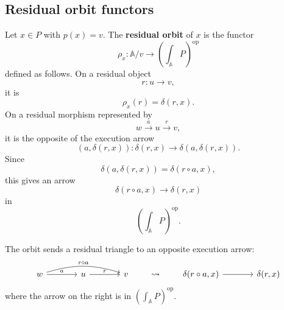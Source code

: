 \subsection{Residual orbit functors}
\label{subsec:orbit-functors}

\begin{definition}
\label{def:residual-orbit}
    Let \(x\in P\) with \(p(x)=v\). The \textbf{residual orbit} of \(x\) is the functor
    \[
        \rho_x:\mathbb A/v\to
        \left(\int_{\mathbb A}P\right)^{\mathrm{op}}
    \]
    defined as follows. On a residual object
    \[
        r:u\to v,
    \]
    it is
    \[
        \rho_x(r)=\delta(r,x).
    \]
    On a residual morphism represented by
    \[
        w\xrightarrow{a}u\xrightarrow{r}v,
    \]
    it is the opposite of the execution arrow
    \[
        (a,\delta(r,x)):
        \delta(r,x)\to\delta(a,\delta(r,x)).
    \]
    Since
    \[
        \delta(a,\delta(r,x))=\delta(r\circ a,x),
    \]
    this gives an arrow
    \[
        \delta(r\circ a,x)\to\delta(r,x)
    \]
    in
    \[
        \left(\int_{\mathbb A}P\right)^{\mathrm{op}}.
    \]
\end{definition}

The orbit sends a residual triangle to an opposite execution arrow:
\[
    \begin{tikzcd}[column sep=large, row sep=large]
            w
                \arrow[r, "a"]
                \arrow[rr, "r\circ a", bend left=17]
        &
            u
                \arrow[r, "r"]
        &
            v
    \end{tikzcd}
    \qquad\leadsto\qquad
    \begin{tikzcd}[column sep=large, row sep=large]
            \delta(r\circ a,x)
                \arrow[r]
        &
            \delta(r,x)
    \end{tikzcd}
\]
where the arrow on the right is in \(\left(\int_{\mathbb A}P\right)^{\mathrm{op}}\).

